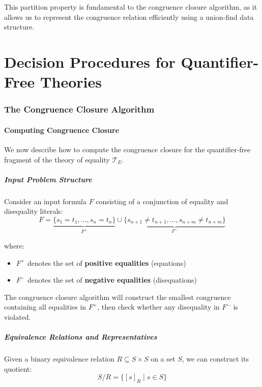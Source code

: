 \documentclass[11pt,a4paper]{article}
\theoremstyle{definition}
\theoremstyle{plain}
\theoremstyle{remark}
\begin{document}
This partition property is fundamental to the congruence closure algorithm, as it allows us to represent the congruence relation efficiently using a union-find data structure.

\newpage

\part{Decision Procedures for Quantifier-Free Theories}

\section{The Congruence Closure Algorithm}

\subsection{Computing Congruence Closure}

We now describe how to compute the congruence closure for the quantifier-free fragment of the theory of equality $\mathcal{T}_E$.

\subsubsection{Input Problem Structure}

Consider an input formula $F$ consisting of a conjunction of equality and disequality literals:
\[
F = \underbrace{\{s_1 = t_1, \dots, s_n = t_n\}}_{F^+} \cup \underbrace{\{s_{n+1} \neq t_{n+1}, \dots, s_{n+m} \neq t_{n+m}\}}_{F^-}
\]

where:
\begin{itemize}
    \item $F^+$ denotes the set of \textbf{positive equalities} (equations)
    \item $F^-$ denotes the set of \textbf{negative equalities} (disequations)
\end{itemize}

The congruence closure algorithm will construct the smallest congruence containing all equalities in $F^+$, then check whether any disequality in $F^-$ is violated.

\subsubsection{Equivalence Relations and Representatives}

Given a binary equivalence relation $R \subseteq S \times S$ on a set $S$, we can construct its quotient:
\[
S/R = \{[s]_R \mid s \in S\}
\]
\end{document}
